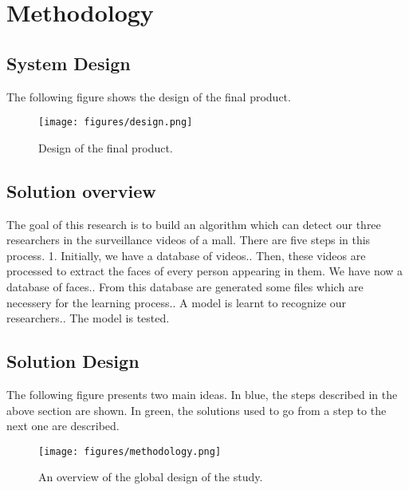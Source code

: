 \setlength{\footskip}{8mm}

\chapter{Methodology}
\label{ch:methodology}

\section{System Design}
The following figure shows the design of the final product. 
\begin{figure}[!ht]
  \centering
  \texttt{[image: figures/design.png]}  
  \caption[Design of the final product.]{Design of the final product.}
  \label{fig:Design}
\end{figure}
\FloatBarrier

\section{Solution overview}

The goal of this research is to build an algorithm which can detect our three researchers in the surveillance videos of a mall. There are five steps in this process.
1. Initially, we have a database of videos.. Then, these videos are processed to extract the faces of every person appearing in them. We have now a database of faces.. From this database are generated some files which are necessery for the learning process.. A model is learnt to recognize our researchers.. The model is tested.

\section{Solution Design}

The following figure presents two main ideas. In blue, the steps described in the above section are shown. In green, the solutions used to go from a step to the next one are described.\newline
\begin{figure}[!ht]
  \centering
  \texttt{[image: figures/methodology.png]}  
  \caption[An overview of the global design of the study.]{An overview of the global design of the study.}
  \label{fig:Methodology}
\end{figure}
\FloatBarrier

